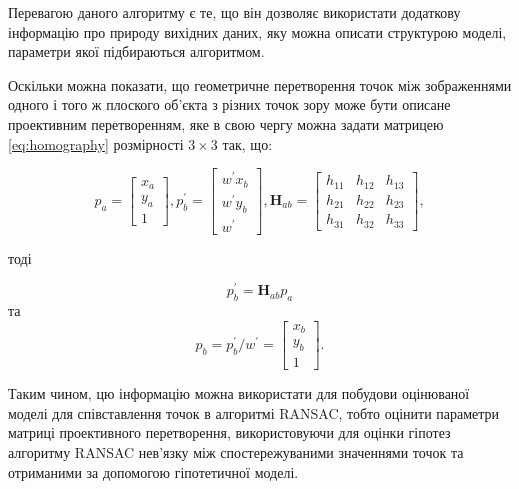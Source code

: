 Перевагою даного алгоритму є те, що він дозволяє використати додаткову інформацію про природу вихідних даних, яку можна описати структурою моделі, параметри якої підбираються алгоритмом. 

Оскільки можна показати\cite{Szeliski:2005fk}, що геометричне перетворення точок між зображеннями одного і того ж плоского об'єкта з різних точок зору може бути описане проективним перетворенням, яке в свою чергу можна задати матрицею \ref{eq:homography} розмірності $3\times3$ так, що:

  \begin{equation}
    \label{eq:homography}
    p_a = 
    \begin{bmatrix}
      x_a  \\
      y_a  \\
      1
    \end{bmatrix}
    ,
    p^\prime_b = 
    \begin{bmatrix} 
      w^{\prime}x_b \\
      w^{\prime}y_{b} \\
      w^{\prime}
    \end{bmatrix}
    , 
    \mathbf{H}_{ab} = 
    \begin{bmatrix} 
      h_{11} & h_{12} & h_{13} \\
      h_{21} & h_{22} & h_{23} \\
      h_{31} & h_{32} & h_{33} 
    \end{bmatrix} 
    ,
  \end{equation}

тоді

  \begin{equation*}
    p^\prime_b = \mathbf{H}_{ab}p_a
  \end{equation*}
   та
  \begin{equation*}
    p_b = p^\prime_b/w^\prime = 
    \begin{bmatrix} 
      x_b  \\
      y_b  \\
      1
    \end{bmatrix}.
  \end{equation*}

Таким чином, цю інформацію можна використати для побудови оцінюваної моделі для співставлення точок в алгоритмі RANSAC, тобто оцінити параметри матриці проективного перетворення, використовуючи для оцінки гіпотез алгоритму RANSAC нев'язку між спостережуваними значеннями точок та отриманими за допомогою гіпотетичної моделі. 

